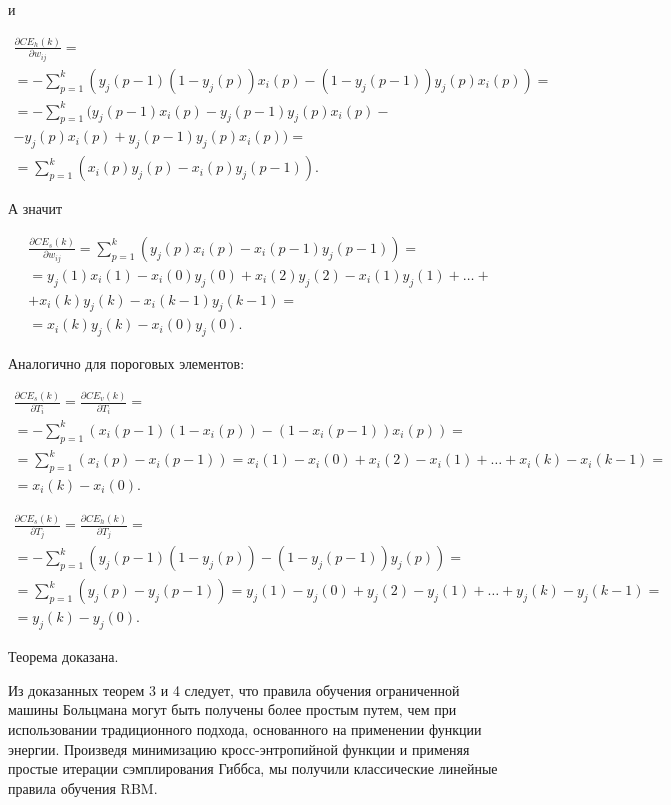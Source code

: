 и

\begin{multline*}
	\frac{\partial CE_h(k)}{\partial w_{ij}} = \\ = -\sum_{p=1}^k (y_j(p-1)(1-y_j(p))x_i(p)-(1-y_j(p-1))y_j(p)x_i(p)) = \\ = -\sum_{p=1}^{k} (y_j(p-1)x_i(p)-y_j(p-1)y_j(p)x_i(p)-\\-y_j(p)x_i(p)+y_j(p-1)y_j(p)x_i(p)) = \\ = \sum_{p=1}^{k} (x_i(p)y_j(p)-x_i(p)y_j(p-1)).
\end{multline*}

А значит

\begin{multline*}
	\frac{\partial CE_s(k)}{\partial w_{ij}} = \sum_{p=1}^{k}(y_j(p)x_i(p)-x_i(p-1)y_j(p-1)) = \\ = y_j(1)x_i(1)-x_i(0)y_j(0)+x_i(2)y_j(2)-x_i(1)y_j(1)+\dots+\\+x_i(k)y_j(k)-x_i(k-1)y_j(k-1)=\\=x_i(k)y_j(k)-x_i(0)y_j(0).
\end{multline*}

Аналогично для пороговых элементов:

\begin{multline*}
	\frac{\partial CE_s(k)}{\partial T_i} = \frac{\partial CE_v(k)}{\partial T_i} =\\= -\sum_{p=1}^k (x_i(p-1)(1-x_i(p))-(1-x_i(p-1))x_i(p)) =\\= \sum_{p=1}^k (x_i(p) - x_i(p-1)) = x_i(1)-x_i(0)+x_i(2) - x_i(1) +\dots+x_i(k)-x_i(k-1) =\\= x_i(k)-x_i(0).
\end{multline*}

\begin{multline*}
	\frac{\partial CE_s(k)}{\partial T_j} = \frac{\partial CE_h(k)}{\partial T_j} =\\= -\sum_{p=1}^k (y_j(p-1)(1-y_j(p))-(1-y_j(p-1))y_j(p)) =\\= \sum_{p=1}^k (y_j(p) - y_j(p-1)) = y_j(1)-y_j(0)+y_j(2) - y_j(1) +\dots+y_j(k)-y_j(k-1) =\\= y_j(k)-y_j(0).
\end{multline*}

Теорема доказана.

Из доказанных теорем 3 и 4 следует, что правила обучения ограниченной машины Больцмана могут быть получены более простым путем, чем при использовании традиционного подхода, основанного на применении функции энергии. Произведя минимизацию кросс-энтропийной функции и применяя простые итерации сэмплирования Гиббса, мы получили классические линейные правила обучения RBM.

